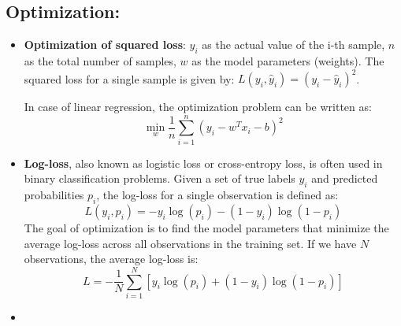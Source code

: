 \documentclass[16pt]{article}
\begin{document}
	\subsection{Optimization:}
	\begin{itemize}
		\item \textbf{Optimization of squared loss}: \(y_i\) as the actual value of the i-th sample,  \(n\) as the total number of samples, \(w\) as the model parameters (weights). The squared loss for a single sample is given by: $ L(y_i, \hat{y}_i) = (y_i - \hat{y}_i)^2 $.
		
		In case of linear regression, the optimization problem can be written as:
		$$\min_{w} \frac{1}{n} \sum_{i=1}^{n} (y_i - w^T x_i - b)^2$$
		\item \textbf{Log-loss}, also known as logistic loss or cross-entropy loss, is often used in binary classification problems. Given a set of true labels \(y_i\) and predicted probabilities \(p_i\), the log-loss for a single observation is defined as:
		\[
		L(y_i, p_i) = -y_i \log(p_i) - (1 - y_i) \log(1 - p_i)
		\]
		The goal of optimization is to find the model parameters that minimize the average log-loss across all observations in the training set. If we have \(N\) observations, the average log-loss is:
		\[
		L = -\frac{1}{N} \sum_{i=1}^{N} [y_i \log(p_i) + (1 - y_i) \log(1 - p_i)]
		\]
		\item 
	\end{itemize}
	
\end{document}
